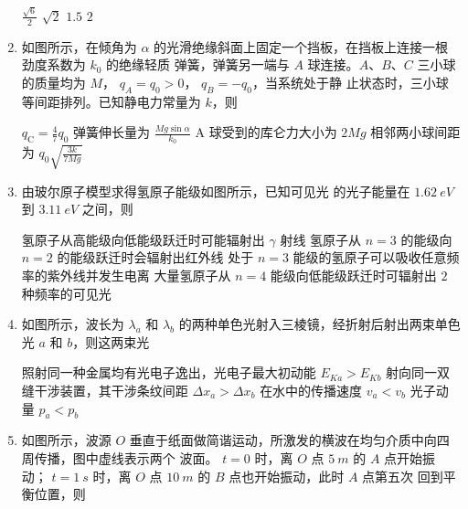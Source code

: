 \begin{enumerate}
\fourchoices
{$\frac{\sqrt{6}}{2}$}
{$\sqrt{2}$}
{$ 1.5 $}
{$ 2 $}


\item
如图所示，在倾角为 $ \alpha $ 的光滑绝缘斜面上固定一个挡板，在挡板上连接一根劲度系数为 $ k_{0} $ 的绝缘轻质
弹簧，弹簧另一端与 $ A $ 球连接。$ A $、$ B $、$ C $ 三小球的质量均为 $ M $， $ q_{A} =q_{0}>0 $， $ q_{B} =-q_{0} $，当系统处于静
止状态时，三小球等间距排列。已知静电力常量为 $ k $，则  
\begin{figure}[h!]
\centering

\end{figure}


\fourchoices
{$q_{\mathrm{C}}=\frac{4}{7} q_{0}$}
{弹簧伸长量为 $\frac{M g \sin \alpha}{k_{0}}$}
{A 球受到的库仑力大小为 $2 M g$}
{相邻两小球间距为 $q_{0} \sqrt{\frac{3 k}{7 M g}}$}




\item
由玻尔原子模型求得氢原子能级如图所示，已知可见光 的光子能量在 $ 1.62 \ eV $ 到 $ 3.11 \ eV $ 之间，则  
\begin{figure}[h!]
\centering

\end{figure}


\fourchoices
{氢原子从高能级向低能级跃迁时可能辐射出 $ \gamma $ 射线}
{氢原子从 $ n=3 $ 的能级向 $ n=2 $ 的能级跃迁时会辐射出红外线}
{处于 $ n=3 $ 能级的氢原子可以吸收任意频率的紫外线并发生电离}
{大量氢原子从 $ n=4 $ 能级向低能级跃迁时可辐射出 $ 2 $ 种频率的可见光}



\item
如图所示，波长为 $ \lambda_{a} $ 和 $ \lambda_{b} $ 的两种单色光射入三棱镜，经折射后射出两束单色光 $ a $ 和 $ b $，则这两束光  
\begin{figure}[h!]
\centering

\end{figure}


\fourchoices
{照射同一种金属均有光电子逸出，光电子最大初动能 $ E_{Ka}>E_{Kb} $}
{射向同一双缝干涉装置，其干涉条纹间距 $ \Delta x_a> \Delta x_b $}
{在水中的传播速度 $ v_a<v_b $}
{光子动量 $ p_a<p_b $}


\item
如图所示，波源 $ O $ 垂直于纸面做简谐运动，所激发的横波在均匀介质中向四周传播，图中虚线表示两个
波面。 $ t=0 $ 时，离 $ O $ 点 $ 5 \ m $ 的 $ A $ 点开始振动； $ t=1 \ s $ 时，离 $ O $ 点 $ 10 \ m $ 的 $ B $ 点也开始振动，此时 $ A $ 点第五次
回到平衡位置，则  
\begin{figure}[h!]
\centering

\end{figure}


\end{enumerate}
